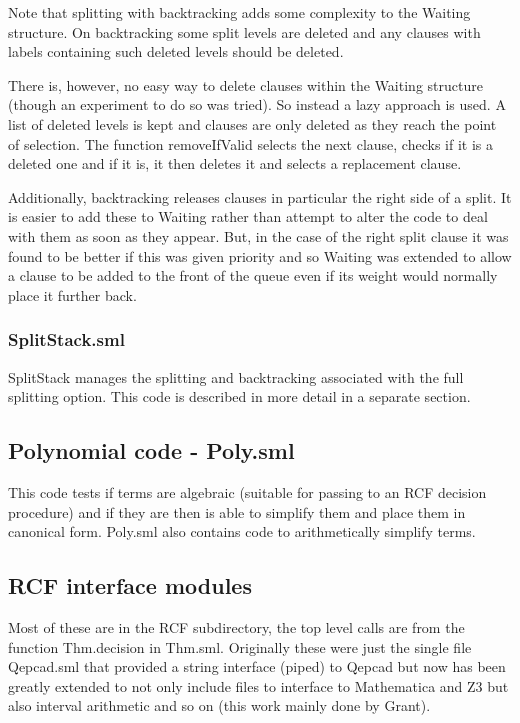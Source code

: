 \documentclass[11pt, oneside]{article}   	%
\begin{document}
Note that splitting with backtracking adds some complexity to the Waiting structure. On backtracking some split levels are deleted and any clauses with labels containing such
deleted levels should be deleted.

There is, however, no easy way to delete clauses within the Waiting structure (though an experiment to do so was tried). 
So instead a lazy approach is used. A list of deleted levels is kept and clauses are only deleted as they reach the point of selection.
The function removeIfValid selects the next clause, checks if it is a deleted one and if it is, it then deletes it and selects a replacement clause.

Additionally, backtracking releases clauses in particular the right side of a split. It is easier to add these to Waiting rather than attempt to alter
the code to deal with them as soon as they appear. But, in the case of the right split clause it was found to be better if this was given priority and
so Waiting was extended to allow a clause to be added to the front of the queue even if its weight would normally place it further back.

\subsubsection{SplitStack.sml}
SplitStack manages the splitting and backtracking associated with the full splitting option. This code is described in more detail in a separate section.

\subsection{Polynomial code - Poly.sml}
This code tests if terms are algebraic (suitable for passing to an RCF decision procedure) and if they are then is able to simplify them and place them in canonical form.
Poly.sml also contains code to arithmetically simplify terms.


\subsection{RCF interface modules}
Most of these are in the RCF subdirectory, the top level calls are from the function Thm.decision in Thm.sml. Originally these were just the single file Qepcad.sml that provided a string interface (piped) to Qepcad but now has been greatly extended to not only include files to interface to Mathematica and Z3 but also interval arithmetic and so on (this work mainly done by Grant).
\end{document}
